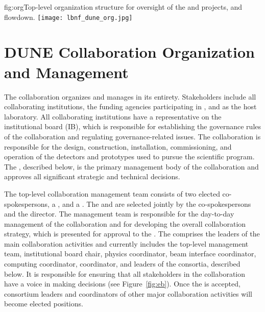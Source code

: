 \begin{dunefigure}	
{fig:org}{Top-level organization structure for oversight of the  and  projects, and flowdown.}
\texttt{[image: lbnf\_dune\_org.jpg]}  
\end{dunefigure}


\section{DUNE Collaboration Organization and Management}
\label{sec:exec:collab:org}

The  collaboration organizes and manages  in its entirety.  Stakeholders include all collaborating institutions, %
the funding agencies participating in , and  as the host laboratory.  All collaborating institutions have a representative on the  institutional board (IB), which is responsible for establishing the governance rules of the collaboration and regulating governance-related issues. The collaboration is responsible for the design, construction, installation, commissioning, and operation of the detectors and prototypes used to pursue the scientific program. The  , described below, is the primary management body of the collaboration and approves all significant strategic and technical decisions.

The top-level  collaboration management team consists of two elected co-spokespersons, a , and a . The  and  are selected jointly by the co-spokespersons and the  director. The management team is responsible for the day-to-day management of the collaboration and for developing the overall collaboration strategy, which is presented for approval to the . The  %
comprises the leaders of the main collaboration activities and currently includes %
the top-level management team, institutional board chair, physics coordinator, beam interface coordinator, computing coordinator,  coordinator, and leaders of the  consortia, described below. It is responsible for  ensuring that all stakeholders in the collaboration have a voice in making decisions (see Figure~\ref{fig:eb}). 
Once the     is accepted, consortium leaders and coordinators of other major collaboration activities will become elected positions.

